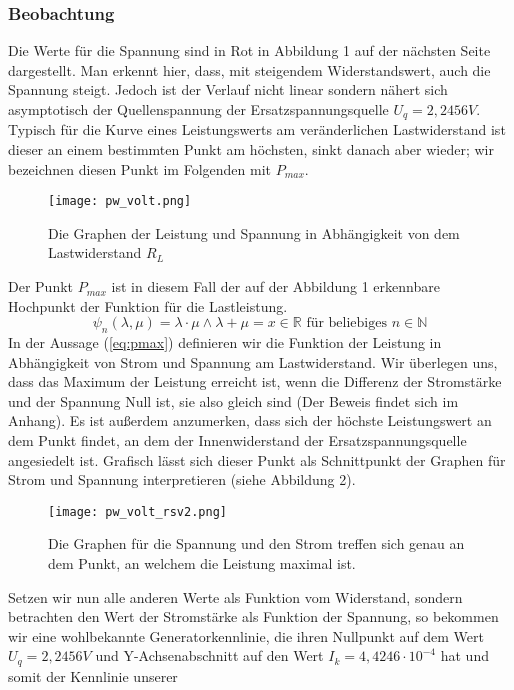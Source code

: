 \documentclass{scrarticle}
\begin{document}
\subsubsection{Beobachtung}
Die Werte für die Spannung sind in Rot in Abbildung 1 auf der nächsten Seite dargestellt. Man erkennt hier, dass, mit steigendem Widerstandswert,
auch die Spannung steigt. Jedoch ist der Verlauf nicht linear sondern nähert sich asymptotisch der Quellenspannung der Ersatzspannungsquelle
$U_q = 2,2456V$.
Typisch für die Kurve eines Leistungswerts am veränderlichen Lastwiderstand ist dieser an einem bestimmten Punkt am höchsten, sinkt danach aber wieder; wir bezeichnen
diesen Punkt im Folgenden mit $P_{max}$.
\begin{figure}[h]
  \begin{center}
    \texttt{[image: pw\_volt.png]}
    \caption{Die Graphen der Leistung und Spannung in Abhängigkeit von dem Lastwiderstand $R_L$}
  \end{center}
\end{figure}
Der Punkt $P_{max}$ ist in diesem Fall der auf der Abbildung 1 erkennbare Hochpunkt der Funktion für die Lastleistung.
\begin{equation}\label{eq:pmax}
  \psi_n(\lambda, \mu) = \lambda \cdot \mu \land \lambda + \mu = x \in \mathbb{R} \text{ für beliebiges }n\in\mathbb{N}
\end{equation}
In der Aussage (\ref{eq:pmax}) definieren wir die Funktion der Leistung in Abhängigkeit von Strom und Spannung am Lastwiderstand. Wir überlegen uns, dass das Maximum der Leistung erreicht ist, wenn die Differenz der Stromstärke und der Spannung Null ist, sie also gleich sind (Der Beweis findet sich im Anhang).
Es ist außerdem anzumerken, dass sich der höchste Leistungswert an dem Punkt findet, an dem der Innenwiderstand der Ersatzspannungsquelle angesiedelt ist. Grafisch lässt sich dieser Punkt als Schnittpunkt der Graphen für Strom und Spannung interpretieren (siehe Abbildung 2).
\begin{figure}[h]
  \begin{center}
    \label{fig:all}
    \texttt{[image: pw\_volt\_rsv2.png]}
    \caption{Die Graphen für die Spannung und den Strom treffen sich genau an dem Punkt, an welchem die Leistung maximal ist.}
  \end{center}
\end{figure}
Setzen wir nun alle anderen Werte als Funktion vom Widerstand, sondern betrachten den Wert der Stromstärke
als Funktion der Spannung, so bekommen wir eine wohlbekannte Generatorkennlinie, die ihren Nullpunkt auf dem Wert $U_q = 2,2456V$ und Y-Achsenabschnitt auf den Wert $I_k = 4,4246\cdot 10^{-4}$ hat und somit der Kennlinie unserer
\end{document}
